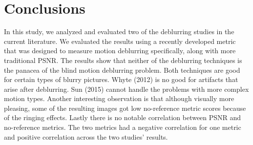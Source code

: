 \documentclass[10pt,twocolumn,letterpaper]{article}
\begin{document}
\section{Conclusions}
In this study, we analyzed and evaluated two of the deblurring studies in the current literature. We evaluated the results using a recently developed metric that was designed to measure motion deblurring specifically, along with more traditional PSNR. The results show that neither of the deblurring techniques is the panacea of the blind motion deblurring problem. Both techniques are good for certain types of blurry pictures. Whyte \etal (2012) is no good for artifacts that arise after deblurring. Sun \etal (2015) cannot handle the problems with more complex motion types. Another interesting observation is that although visually more pleasing, some of the resulting images got low no-reference metric scores because of the ringing effects. Lastly there is no notable correlation between PSNR and no-reference metrics. The two metrics had a negative correlation for one metric and positive correlation across the two studies' results.



{\small


}
\end{document}
